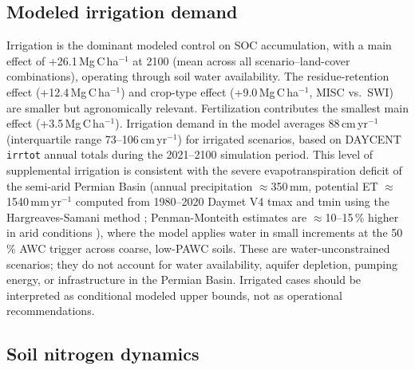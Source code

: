 \documentclass[11pt]{article}
\begin{document}
\subsection*{Modeled irrigation demand}

Irrigation is the dominant modeled control on SOC accumulation, with a main effect of +26.1\,Mg\,C\,ha$^{-1}$ at 2100 (mean across all scenario--land-cover combinations), operating through soil water availability. The residue-retention effect (+12.4\,Mg\,C\,ha$^{-1}$) and crop-type effect (+9.0\,Mg\,C\,ha$^{-1}$, MISC vs.\ SWI) are smaller but agronomically relevant. Fertilization contributes the smallest main effect (+3.5\,Mg\,C\,ha$^{-1}$). Irrigation demand in the model averages 88\,cm\,yr$^{-1}$ (interquartile range 73--106\,cm\,yr$^{-1}$) for irrigated scenarios, based on DAYCENT \texttt{irrtot} annual totals during the 2021--2100 simulation period. This level of supplemental irrigation is consistent with the severe evapotranspiration deficit of the semi-arid Permian Basin (annual precipitation $\approx$350\,mm, potential ET $\approx$1540\,mm\,yr$^{-1}$ computed from 1980--2020 Daymet V4 tmax and tmin using the Hargreaves-Samani method \citep{Hargreaves1985,Thornton2022Daymet}; Penman-Monteith estimates are $\approx$10--15\,\% higher in arid conditions \citep{Allen1998FAO56}), where the model applies water in small increments at the 50\,\% AWC trigger across coarse, low-PAWC soils. These are water-unconstrained scenarios; they do not account for water availability, aquifer depletion, pumping energy, or infrastructure in the Permian Basin. Irrigated cases should be interpreted as conditional modeled upper bounds, not as operational recommendations.

\subsection*{Soil nitrogen dynamics}
\end{document}
